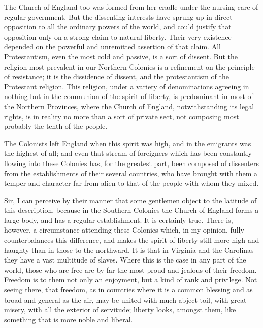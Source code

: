 The Church of England too was formed from her cradle under the nursing care of regular government. But the dissenting interests have sprung up in direct opposition to all the ordinary powers of the world, and could justify that opposition only on a strong claim to natural liberty. Their very existence depended on the powerful and unremitted assertion of that claim. All Protestantism, even the most cold and passive, is a sort of dissent. But the religion most prevalent in our Northern Colonies is a refinement on the principle of resistance; it is the dissidence of dissent, and the protestantism of the Protestant religion. This religion, under a variety of denominations agreeing in nothing but in the communion of the spirit of liberty, is predominant in most of the Northern Provinces, where the Church of England, notwithstanding its legal rights, is in reality no more than a sort of private sect, not composing most probably the tenth of the people.\par

The Colonists left England when this spirit was high, and in the emigrants was the highest of all; and even that stream of foreigners which has been constantly flowing into these Colonies has, for the greatest part, been composed of dissenters from the establishments of their several countries, who have brought with them a temper and character far from alien to that of the people with whom they mixed.\par

Sir, I can perceive by their manner that some gentlemen object to the latitude of this description, because in the Southern Colonies the Church of England forms a large body, and has a regular establishment. It is certainly true. There is, however, a circumstance attending these Colonies which, in my opinion, fully counterbalances this difference, and makes the spirit of liberty still more high and haughty than in those to the northward. It is that in Virginia and the Carolinas they have a vast multitude of slaves. Where this is the case in any part of the world, those who are free are by far the most proud and jealous of their freedom. Freedom is to them not only an enjoyment, but a kind of rank and privilege. Not seeing there, that freedom, as in countries where it is a common blessing and as broad and general as the air, may be united with much abject toil, with great misery, with all the exterior of servitude; liberty looks, amongst them, like something that is more noble and liberal.\par

